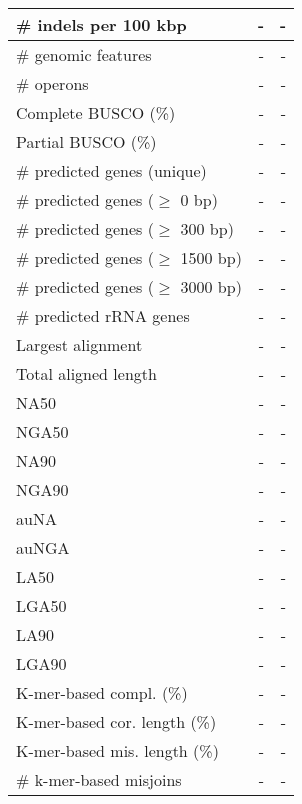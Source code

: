 \documentclass[12pt,a4paper]{article}
\begin{document}
\begin{table}[ht]
\begin{center}
\begin{tabular}{|l*{2}{|r}|}
\# indels per 100 kbp & - & - \\ \hline
\# genomic features & - & - \\ \hline
\# operons & - & - \\ \hline
Complete BUSCO (\%) & - & - \\ \hline
Partial BUSCO (\%) & - & - \\ \hline
\# predicted genes (unique) & - & - \\ \hline
\# predicted genes ($\geq$ 0 bp) & - & - \\ \hline
\# predicted genes ($\geq$ 300 bp) & - & - \\ \hline
\# predicted genes ($\geq$ 1500 bp) & - & - \\ \hline
\# predicted genes ($\geq$ 3000 bp) & - & - \\ \hline
\# predicted rRNA genes & - & - \\ \hline
Largest alignment & - & - \\ \hline
Total aligned length & - & - \\ \hline
NA50 & - & - \\ \hline
NGA50 & - & - \\ \hline
NA90 & - & - \\ \hline
NGA90 & - & - \\ \hline
auNA & - & - \\ \hline
auNGA & - & - \\ \hline
LA50 & - & - \\ \hline
LGA50 & - & - \\ \hline
LA90 & - & - \\ \hline
LGA90 & - & - \\ \hline
K-mer-based compl. (\%) & - & - \\ \hline
K-mer-based cor. length (\%) & - & - \\ \hline
K-mer-based mis. length (\%) & - & - \\ \hline
\# k-mer-based misjoins & - & - \\ \hline
\end{tabular}
\end{center}
\end{table}
\end{document}
